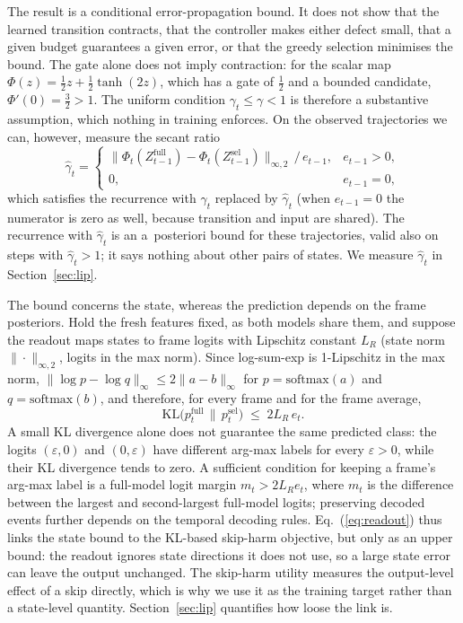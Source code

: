 The result is a conditional error-propagation bound. It does not show that the learned transition contracts, that the controller makes either defect small, that a given budget guarantees a given error, or that the greedy selection minimises the bound. The gate alone does not imply contraction: for the scalar map $\Phi(z)=\tfrac12 z+\tfrac12\tanh(2z)$, which has a gate of $\tfrac12$ and a bounded candidate, $\Phi'(0)=\tfrac32>1$. The uniform condition $\gamma_t\le\gamma<1$ is therefore a substantive assumption, which nothing in training enforces. On the observed trajectories we can, however, measure the secant ratio
\[
\hat\gamma_t=\begin{cases}\big\|\Phi_t(Z^{\mathrm{full}}_{t-1})-\Phi_t(Z^{\mathrm{sel}}_{t-1})\big\|_{\infty,2}\,/\,e_{t-1}, & e_{t-1}>0,\\ 0, & e_{t-1}=0,\end{cases}
\]
which satisfies the recurrence with $\gamma_t$ replaced by $\hat\gamma_t$ (when $e_{t-1}=0$ the numerator is zero as well, because transition and input are shared). The recurrence with $\hat\gamma_t$ is an a~posteriori bound for these trajectories, valid also on steps with $\hat\gamma_t>1$; it says nothing about other pairs of states. We measure $\hat\gamma_t$ in Section~\ref{sec:lip}.

The bound concerns the state, whereas the prediction depends on the frame posteriors. Hold the fresh features fixed, as both models share them, and suppose the readout maps states to frame logits with Lipschitz constant $L_R$ (state norm $\|\cdot\|_{\infty,2}$, logits in the max norm). Since log-sum-exp is 1-Lipschitz in the max norm, $\|\log p-\log q\|_\infty\le2\|a-b\|_\infty$ for $p=\mathrm{softmax}(a)$ and $q=\mathrm{softmax}(b)$, and therefore, for every frame and for the frame average,
\begin{equation}
\mathrm{KL}\big(p^{\mathrm{full}}_t\,\|\,p^{\mathrm{sel}}_t\big)\;\le\;2L_R\,e_t .
\label{eq:readout}
\end{equation}
A small KL divergence alone does not guarantee the same predicted class: the logits $(\varepsilon,0)$ and $(0,\varepsilon)$ have different arg-max labels for every $\varepsilon>0$, while their KL divergence tends to zero. A sufficient condition for keeping a frame's arg-max label is a full-model logit margin $m_t>2L_Re_t$, where $m_t$ is the difference between the largest and second-largest full-model logits; preserving decoded events further depends on the temporal decoding rules. Eq.~(\ref{eq:readout}) thus links the state bound to the KL-based skip-harm objective, but only as an upper bound: the readout ignores state directions it does not use, so a large state error can leave the output unchanged. The skip-harm utility measures the output-level effect of a skip directly, which is why we use it as the training target rather than a state-level quantity. Section~\ref{sec:lip} quantifies how loose the link is.
